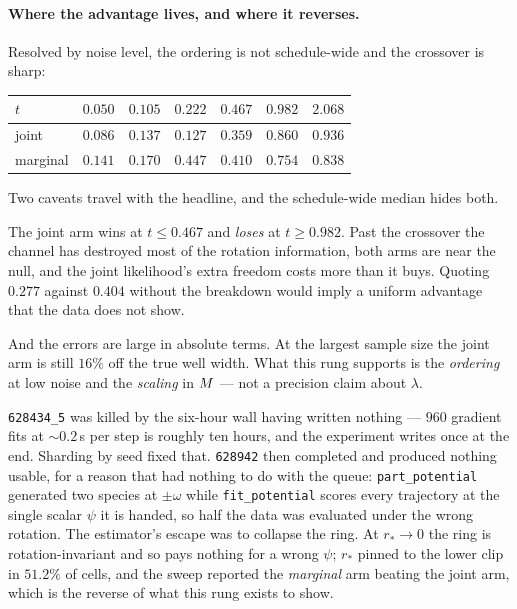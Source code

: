 \paragraph{Where the advantage lives, and where it reverses.} Resolved by noise level, the
ordering is not schedule-wide and the crossover is sharp:

\begin{center}\small
\begin{tabular}{@{}lcccccc@{}}
\toprule
$t$ & $0.050$ & $0.105$ & $0.222$ & $0.467$ & $0.982$ & $2.068$ \\
\midrule
joint    & $\mathbf{0.086}$ & $\mathbf{0.137}$ & $\mathbf{0.127}$ & $\mathbf{0.359}$ & $0.860$ & $0.936$ \\
marginal & $0.141$ & $0.170$ & $0.447$ & $0.410$ & $\mathbf{0.754}$ & $\mathbf{0.838}$ \\
\bottomrule
\end{tabular}
\end{center}

\begin{pitfall}
Two caveats travel with the headline, and the schedule-wide median hides both.

The joint arm wins at $t \leq 0.467$ and \emph{loses} at $t \geq 0.982$. Past the crossover
the channel has destroyed most of the rotation information, both arms are near the null, and
the joint likelihood's extra freedom costs more than it buys. Quoting $0.277$ against $0.404$
without the breakdown would imply a uniform advantage that the data does not show.

And the errors are large in absolute terms. At the largest sample size the joint arm is still
$16\%$ off the true well width. What this rung supports is the \emph{ordering} at low noise and
the \emph{scaling} in $M$ --- not a precision claim about $\lambda$.
\end{pitfall}

\texttt{628434\_5} was killed by the six-hour wall having written nothing --- $960$ gradient fits at
${\sim}0.2$\,s per step is roughly ten hours, and the experiment writes once at the end. Sharding by
seed fixed that. \texttt{628942} then completed and produced nothing usable, for a reason that had
nothing to do with the queue: \texttt{part\_potential} generated two species at $\pm\omega$ while
\texttt{fit\_potential} scores every trajectory at the single scalar $\psi$ it is handed, so half the
data was evaluated under the wrong rotation. The estimator's escape was to collapse the ring. At
$r_*\to0$ the ring is rotation-invariant and so pays nothing for a wrong $\psi$; $r_*$ pinned to the
lower clip in $51.2\%$ of cells, and the sweep reported the \emph{marginal} arm beating the joint
arm, which is the reverse of what this rung exists to show.

